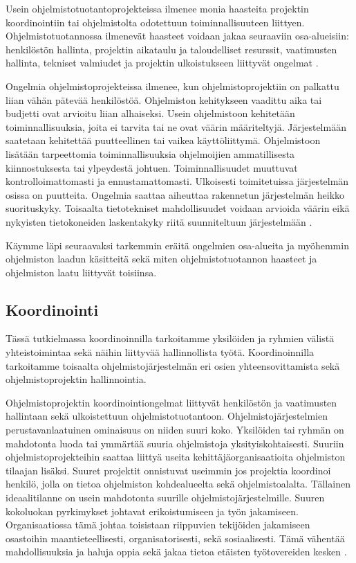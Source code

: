 \documentclass[finnish]{tktltiki2}
\theoremstyle{definition}
\theoremstyle{remark}
\begin{document}
Usein ohjelmistotuotantoprojekteissa ilmenee monia haasteita projektin koordinointiin tai ohjelmistolta odotettuun toiminnallisuuteen liittyen. Ohjelmistotuotannossa ilmenevät haasteet voidaan jakaa seuraaviin osa-alueisiin: henkilöstön hallinta, projektin aikataulu ja taloudelliset resurssit, vaatimusten hallinta, tekniset valmiudet ja projektin ulkoistukseen liittyvät ongelmat \cite{BOE88}.

Ongelmia  ohjelmistoprojekteissa ilmenee, kun ohjelmistoprojektiin on palkattu liian vähän pätevää henkilöstöä. Ohjelmiston kehitykseen vaadittu aika tai budjetti ovat arvioitu liian alhaiseksi. Usein ohjelmistoon kehitetään toiminnallisuuksia, joita ei tarvita tai ne ovat väärin määriteltyjä. Järjestelmään saatetaan kehitettää puutteellinen tai vaikea käyttöliittymä. Ohjelmistoon lisätään tarpeettomia toiminnallisuuksia ohjelmoijien ammatillisesta kiinnostuksesta tai ylpeydestä johtuen. Toiminnallisuudet muuttuvat kontrolloimattomasti ja ennustamattomasti. Ulkoisesti toimitetuissa järjestelmän osissa on puutteita. Ongelmia saattaa aiheuttaa rakennetun järjestelmän heikko suorituskyky. Toisaalta tietotekniset mahdollisuudet voidaan arvioida väärin eikä nykyisten tietokoneiden laskentakyky riitä suunniteltuun järjestelmään \cite{BOE88}.

Käymme läpi seuraavaksi tarkemmin eräitä ongelmien osa-alueita ja myöhemmin ohjelmiston laadun käsitteitä sekä miten ohjelmistotuotannon haasteet ja ohjelmiston laatu liittyvät toisiinsa. 

\subsection{Koordinointi}

Tässä tutkielmassa koordinoinnilla tarkoitamme yksilöiden ja ryhmien välistä yhteistoimintaa sekä näihin liittyvää hallinnollista työtä. Koordinoinnilla tarkoitamme toisaalta ohjelmistojärjestelmän eri osien yhteensovittamista sekä ohjelmistoprojektin hallinnointia.

Ohjelmistoprojektin koordinointiongelmat liittyvät henkilöstön ja vaatimusten hallintaan sekä ulkoistettuun ohjelmistotuotantoon. Ohjelmisto\-järjestelmien perustavanlaatuinen ominaisuus on niiden suuri koko. Yksilöiden tai ryhmän on mahdotonta luoda tai ymmärtää suuria ohjelmistoja yksityiskohtaisesti. Suuriin ohjelmistoprojekteihin saattaa liittyä useita kehittäjä\-organisaatioita ohjelmiston tilaajan lisäksi. Suuret projektit onnistuvat useimmin jos projektia koordinoi henkilö, jolla on tietoa ohjelmiston kohdealueelta sekä ohjelmistoalalta. Tällainen ideaalitilanne on usein mahdotonta suurille ohjelmistojärjestelmille. Suuren kokoluokan pyrkimykset johtavat erikoistumiseen ja työn jakamiseen. Organisaatiossa tämä johtaa toisistaan riippuvien tekijöiden jakamiseen osastoihin maantieteellisesti, organisatorisesti, sekä sosiaalisesti. Tämä vähentää mahdollisuuksia ja haluja oppia sekä jakaa tietoa etäisten työtovereiden kesken \cite{KES95}.
\end{document}
